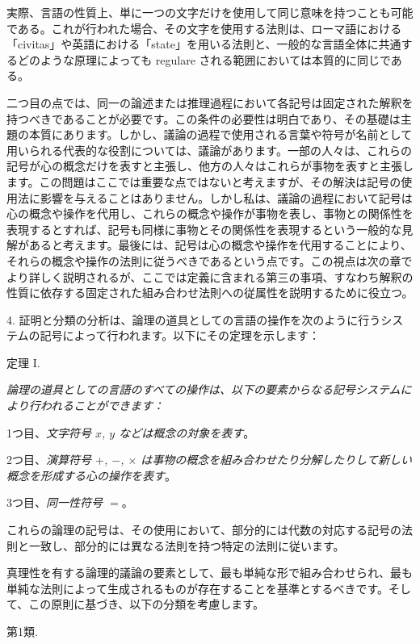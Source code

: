 \documentclass[a4paper,11pt,openany]{ltjsbook}
\begin{document}
実際、言語の性質上、単に一つの文字だけを使用して同じ意味を持つことも可能である。これが行われた場合、その文字を使用する法則は、ローマ語における「civitas」や英語における「state」を用いる法則と、一般的な言語全体に共通するどのような原理によっても regulare される範囲においては本質的に同じである。

二つ目の点では、同一の論述または推理過程において各記号は固定された解釈を持つべきであることが必要です。この条件の必要性は明白であり、その基礎は主題の本質にあります。しかし、議論の過程で使用される言葉や符号が名前として用いられる代表的な役割については、議論があります。一部の人々は、これらの記号が心の概念だけを表すと主張し、他方の人々はこれらが事物を表すと主張します。この問題はここでは重要な点ではないと考えますが、その解決は記号の使用法に影響を与えることはありません。しかし私は、議論の過程において記号は心の概念や操作を代用し、これらの概念や操作が事物を表し、事物との関係性を表現するとすれば、記号も同様に事物とその関係性を表現するという一般的な見解があると考えます。最後には、記号は心の概念や操作を代用することにより、それらの概念や操作の法則に従うべきであるという点です。この視点は次の章でより詳しく説明されるが、ここでは定義に含まれる第三の事項、すなわち解釈の性質に依存する固定された組み合わせ法則への従属性を説明するために役立つ。

4. 証明と分類の分析は、論理の道具としての言語の操作を次のように行うシステムの記号によって行われます。以下にその定理を示します：

\begin{center}
\textsc{定理 I.}
\end{center}

\textit{論理の道具としての言語のすべての操作は、以下の要素からなる記号システムにより行われることができます：}

1つ目、\textit{文字符号 $x$, $y$ などは概念の対象を表す}。

2つ目、\textit{演算符号 $+$, $-$, $\times$ は事物の概念を組み合わせたり分解したりして新しい概念を形成する心の操作を表す}。

3つ目、\textit{同一性符号 $=$}。

これらの論理の記号は、その使用において、部分的には代数の対応する記号の法則と一致し、部分的には異なる法則を持つ特定の法則に従います。

真理性を有する論理的議論の要素として、最も単純な形で組み合わせられ、最も単純な法則によって生成されるものが存在することを基準とするべきです。そして、この原則に基づき、以下の分類を考慮します。

\begin{center}
\textsc{第1類}.
\end{center}
\end{document}

